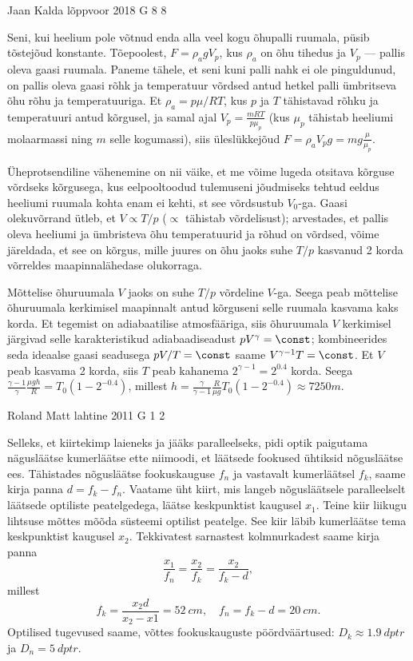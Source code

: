 \documentclass[11pt, twoside]{article}
\begin{document}
{%
{Jaan Kalda} %
{lõppvoor} %
{2018} %
{G 8} %
{8} %
{

\ifSolution
Seni, kui heelium pole võtnud enda alla veel kogu õhupalli ruumala, püsib tõstejõud konstante. Tõepoolest, $F=\rho_a g V_p$, kus $\rho_a$ on õhu tihedus ja $V_p$ --- pallis oleva gaasi ruumala. Paneme tähele, et seni kuni palli nahk ei ole pinguldunud, on pallis oleva gaasi rõhk ja temperatuur võrdsed antud hetkel palli ümbritseva õhu rõhu ja temperatuuriga. Et $\rho_a=p\mu/RT$, kus $p$ ja $T$ tähistavad rõhku ja temperatuuri antud kõrgusel, ja samal ajal $V_p=\frac {mRT}{p\mu_p}$ (kus $\mu_p$ tähistab heeliumi molaarmassi ning $m$ selle kogumassi), siis üleslükkejõud $F=\rho_a V_p g=mg\frac{\mu}{\mu_p}$. 

Üheprotsendiline vähenemine on nii väike, et me võime lugeda otsitava kõrguse võrdseks kõrgusega, kus eelpooltoodud tulemuseni jõudmiseks tehtud eeldus heeliumi ruumala kohta enam ei kehti, st see võrdsustub $V_0$-ga. Gaasi olekuvõrrand ütleb, et $V\propto T/p$ ($\propto$ tähistab võrdelisust); arvestades, et pallis oleva heeliumi ja ümbristeva õhu temperatuurid ja rõhud on võrdsed, võime järeldada, et see on kõrgus, mille juures on õhu jaoks suhe $T/p$  kasvanud 2 korda võrreldes maapinnalähedase olukorraga. 

Mõttelise õhuruumala $V$ jaoks on suhe $T/p$ võrdeline $V$-ga. Seega peab mõttelise õhuruumala kerkimisel maapinnalt antud kõrguseni selle ruumala kasvama kaks korda. Et tegemist on adiabaatilise atmosfääriga, siis õhuruumala $V$ kerkimisel järgivad selle karakteristikud  adiabaadiseadust $pV^\gamma=\const$; kombineerides seda ideaalse gaasi seadusega $pV/T=\const$ saame $V^{\gamma-1}T=\const$. Et $V$ peab kasvama 2 korda, siis $T$ peab kahanema $2^{\gamma-1}=2^{0.4}$ korda. Seega $\frac{\gamma-1}\gamma\frac{\mu g h}R =T_0(1-2^{-0.4})$, millest $h=\frac\gamma{\gamma-1}\frac R{\mu g}T_0(1-2^{-0.4})\approx\SI{7250}m$.
\fi
}

{Roland Matt} %
{lahtine} %
{2011} %
{G 1} %
{2} %
{

\ifSolution
Selleks, et kiirtekimp laieneks ja jääks paralleelseks, pidi optik paigutama
nägusläätse kumerläätse ette niimoodi, et läätsede fookused ühtiksid nõgusläätse
ees. Tähistades nõgusläätse fookuskauguse $f_{n}$ ja vastavalt kumerläätsel
$f_{k}$, saame kirja panna $d=f_{k}-f_{n}$. Vaatame üht kiirt, mis langeb
nõgusläätsele paralleelselt läätsede optiliste peatelgedega, läätse keskpunktist
kaugusel $x_{1}$. Teine kiir liikugu lihtsuse mõttes mõõda süsteemi optilist
peatelge. See kiir läbib kumerläätse tema keskpunktist kaugusel $x_{2}$.
Tekkivatest sarnastest kolmnurkadest saame kirja panna
\[ \frac{x_{1}}{f_{n}}=\frac{x_{2}}{f_{k}}=\frac{x_{2}}{f_{k}-d}, \] millest
\[ f_{k}=\frac{x_{2}d}{x_{2}-x{1}}=\SI{52}{cm},\quad  f_{n}=f_{k}-d=\SI{20}{cm}.\]
Optilised tugevused saame, võttes fookuskauguste pöördväärtused:
$D_{k}\approx\SI{1,9}{dptr}$ ja $D_{n}=\SI{5}{dptr}$.
\fi
}

}
\end{document}
